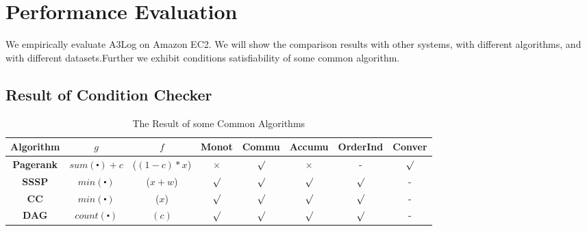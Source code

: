 \section{Performance Evaluation}
\label{sec:expr}

We empirically evaluate A3Log on Amazon EC2. We will show the comparison results with other systems, with different algorithms, and with different datasets.Further we exhibit conditions satisfiability of some common algorithm.
 
\subsection{Result of Condition Checker}
\begin{table}[!t]
	\caption{The Result of some Common Algorithms }
	\hspace{-0.15in}
	\vspace{0.0in}
	\label{tab:resut}
	\centering
	\small
	\begin{tabular}{c|c|c|c|c|c|c|c}
		\hline\hline
		 {\textbf{Algorithm}} &
		 {\textbf{$g$}} &
		 {\textbf{$f$}} & 
		 {\textbf{Monot}} &
		 {\textbf{Commu}} & 
		 {\textbf{Accumu}} & 
		 {\textbf{OrderInd}} &
		 {\textbf{Conver}}\\
		\hline
		\textbf{Pagerank} & $sum(\centerdot)+c$ &($(1-c)*x$)   &$\times$ & $\surd$ & $\times$  & - &$\surd$\\
		\hline
		\textbf{SSSP} & $min(\centerdot)$ & ($x+w$) &$\surd$ & $\surd$& $\surd$ & $\surd$ & -\\
		\hline
		\textbf{CC} & $min(\centerdot)$& ($x$) & $\surd$ & $\surd$ & $\surd$ & $\surd$ & -\\
		\hline
		\textbf{DAG} & $count(\centerdot)$ &$(c)$& $\surd$ &$\surd$& $\surd$ & $\surd$ & -\\
		\hline

\end{tabular}
\end{table}
